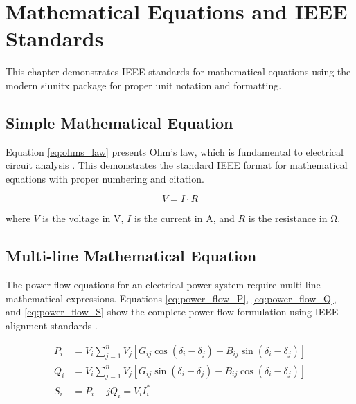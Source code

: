 
\chapter{Mathematical Equations and IEEE Standards}
\label{chap:math}

This chapter demonstrates IEEE standards for mathematical equations using the modern siunitx package for proper unit notation and formatting.

\section{Simple Mathematical Equation}
\label{sec:simple_equation}

Equation \ref{eq:ohms_law} presents Ohm's law, which is fundamental to electrical circuit analysis \cite{alexander2016fundamentals}. This demonstrates the standard IEEE format for mathematical equations with proper numbering and citation.

\begin{equation}
	V = I \cdot R
	\label{eq:ohms_law}
\end{equation}

where $V$ is the voltage in \unit{\volt}, $I$ is the current in \unit{\ampere}, and $R$ is the resistance in \unit{\ohm}.

\section{Multi-line Mathematical Equation}
\label{sec:multiline_equation}

The power flow equations for an electrical power system require multi-line mathematical expressions. Equations \ref{eq:power_flow_P}, \ref{eq:power_flow_Q}, and \ref{eq:power_flow_S} show the complete power flow formulation using IEEE alignment standards \cite{kundur1994power}.

\begin{align}
	P_i &= V_i \sum_{j=1}^{n} V_j \left[ G_{ij} \cos(\delta_i - \delta_j) + B_{ij} \sin(\delta_i - \delta_j) \right] \label{eq:power_flow_P} \\
	Q_i &= V_i \sum_{j=1}^{n} V_j \left[ G_{ij} \sin(\delta_i - \delta_j) - B_{ij} \cos(\delta_i - \delta_j) \right] \label{eq:power_flow_Q} \\
	S_i &= P_i + jQ_i = V_i I_i^* \label{eq:power_flow_S}
\end{align}

